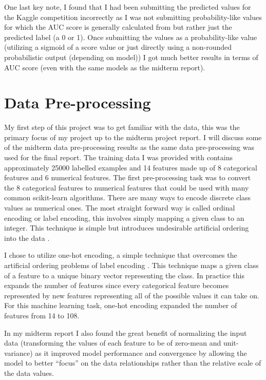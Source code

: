 \documentclass[11pt]{article}
\begin{document}
One last key note, I found that I had been submitting the predicted values for the Kaggle competition incorrectly as I was not submitting probability-like values for which the AUC score is generally calculated from but rather just the predicted label (a 0 or 1).
Once submitting the values as a probability-like value (utilizing a sigmoid of a score value or just directly using a non-rounded probabilistic output (depending on model)) I got much better results in terms of AUC score (even with the same models as the midterm report). 

\section*{Data Pre-processing}
My first step of this project was to get familiar with the data, this was the primary focus of my project up to the midterm project report.
I will discuss some of the midterm data pre-processing results as the same data pre-processing was used for the final report.
The training data I was provided with contains approximately 25000 labelled examples and 14 features made up of 8 categorical features and 6 numerical features.
The first pre-processing task was to convert the 8 categorical features to numerical features that could be used with many common scikit-learn algorithms.
There are many ways to encode discrete class values as numerical ones.
The most straight forward way is called ordinal encoding or label encoding, this involves simply mapping a given class to an integer.
This technique is simple but introduces undesirable artificial ordering into the data \cite{hancock_survey_2020}.

I chose to utilize one-hot encoding, a simple technique that overcomes the artificial ordering problems of label encoding \cite{hancock_survey_2020}. 
This technique maps a given class of a feature to a unique binary vector representing the class.
In practice this expands the number of features since every categorical feature becomes represented by new features representing all of the possible values it can take on. 
For this machine learning task, one-hot encoding expanded the number of features from 14 to 108.

In my midterm report I also found the great benefit of normalizing the input data (transforming the values of each feature to be of zero-mean and unit-variance) as it improved model performance and convergence by allowing the model to better ``focus'' on the data relationships rather than the relative scale of the data values. 
\end{document}
